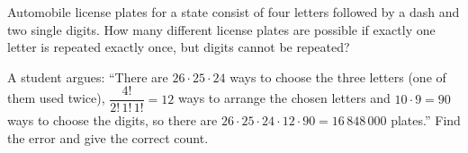 Automobile license plates for a state consist of four letters followed by a dash and two single digits. How many different license plates are possible if exactly one letter is repeated exactly once, but digits cannot be repeated?

A student argues: ``There are $26\cdot25\cdot24$ ways to choose the three letters (one of them used twice), $\dfrac{4!}{2!\,1!\,1!}=12$ ways to arrange the chosen letters and $10\cdot9=90$ ways to choose the digits, so there are $26\cdot25\cdot24\cdot12\cdot90=16\,848\,000$ plates.'' Find the error and give the correct count.
